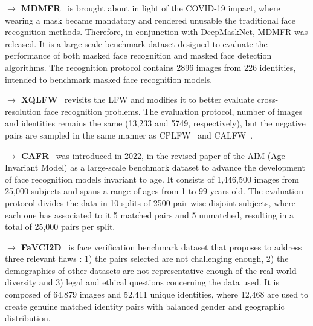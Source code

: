 \documentclass[class=report, crop=false, a4paper, 12pt]{standalone}
\begin{document}
\vspace{0.7\baselineskip}
\noindent\textbf{$\rightarrow$ MDMFR}~\autocite{ullahNovelDeepMaskNetModel2022} is brought about in light of the COVID-19 impact, where wearing a mask became mandatory and rendered unusable the traditional face recognition methods. Therefore, in conjunction with DeepMaskNet, MDMFR was released. It is a large-scale benchmark dataset designed to evaluate the performance of both masked face recognition and masked face detection algorithms. The recognition protocol contains 2896 images from 226 identities, intended to benchmark masked face recognition models.

\vspace{0.7\baselineskip}
\noindent\textbf{$\rightarrow$ XQLFW}~\autocite{knocheCrossQualityLFWDatabase2021} revisits the LFW and modifies it to better evaluate cross-resolution face recognition problems. The evaluation protocol, number of images and identities remains the same (13,233 and 5749, respectively), but the negative pairs are sampled in the same manner as CPLFW~\autocite{zhengCrossPoseLFWDatabase} and CALFW~\autocite{zhengCrossAgeLFWDatabase2017}.

\vspace{0.7\baselineskip}
\noindent\textbf{$\rightarrow$ CAFR}~\autocite{zhaoAgeInvariantFaceRecognition2022} was introduced in 2022, in the revised paper of the AIM (Age-Invariant Model) as a large-scale benchmark dataset to advance the development of face recognition models invariant to age. It consists of 1,446,500 images from 25,000 subjects and spans a range of ages from 1 to 99 years old. The evaluation protocol divides the data in 10 splits of 2500 pair-wise disjoint subjects, where each one has associated to it 5 matched pairs and 5 unmatched, resulting in a total of 25,000 pairs per split.

\vspace{0.7\baselineskip}
\noindent\textbf{$\rightarrow$ FaVCI2D}~\autocite{popescuFaceVerificationChallenging2022} is face verification benchmark dataset that proposes to address three relevant flaws : 1) the pairs selected are not challenging enough,  2) the demographics of other datasets are not representative enough of the real world diversity and 3) legal and ethical questions concerning the data used. It is composed of 64,879 images and 52,411 unique identities, where 12,468 are used to create genuine matched identity pairs with balanced gender and geographic distribution.
\end{document}
